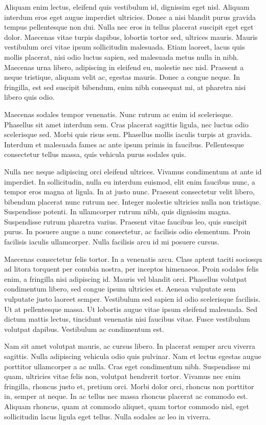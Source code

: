 \documentclass[2pt,a4paper,twoside ]{article}
\begin{document}
\begin{multicols}{2}
Aliquam enim lectus, eleifend quis vestibulum id, dignissim eget nisl. Aliquam interdum eros eget augue imperdiet ultricies. Donec a nisi blandit purus gravida tempus pellentesque non dui. Nulla nec eros in tellus placerat suscipit eget eget dolor. Maecenas vitae turpis dapibus, lobortis tortor sed, ultrices mauris. Mauris vestibulum orci vitae ipsum sollicitudin malesuada. Etiam laoreet, lacus quis mollis placerat, nisi odio luctus sapien, sed malesuada metus nulla in nibh. Maecenas urna libero, adipiscing in eleifend eu, molestie nec nisl. Praesent a neque tristique, aliquam velit ac, egestas mauris. Donec a congue neque. In fringilla, est sed suscipit bibendum, enim nibh consequat mi, at pharetra nisi libero quis odio.

Maecenas sodales tempor venenatis. Nunc rutrum ac enim id scelerisque. Phasellus sit amet interdum sem. Cras placerat sagittis ligula, nec luctus odio scelerisque sed. Morbi quis risus sem. Phasellus mollis iaculis turpis at gravida. Interdum et malesuada fames ac ante ipsum primis in faucibus. Pellentesque consectetur tellus massa, quis vehicula purus sodales quis.

Nulla nec neque adipiscing orci eleifend ultrices. Vivamus condimentum at ante id imperdiet. In sollicitudin, nulla eu interdum euismod, elit enim faucibus nunc, a tempor eros magna at ligula. In at justo nunc. Praesent consectetur velit libero, bibendum placerat nunc rutrum nec. Integer molestie ultricies nulla non tristique. Suspendisse potenti. In ullamcorper rutrum nibh, quis dignissim magna. Suspendisse rutrum pharetra varius. Praesent vitae faucibus leo, quis suscipit purus. In posuere augue a nunc consectetur, ac facilisis odio elementum. Proin facilisis iaculis ullamcorper. Nulla facilisis arcu id mi posuere cursus.

Maecenas consectetur felis tortor. In a venenatis arcu. Class aptent taciti sociosqu ad litora torquent per conubia nostra, per inceptos himenaeos. Proin sodales felis enim, a fringilla nisi adipiscing id. Mauris vel blandit orci. Phasellus volutpat condimentum libero, sed congue ipsum ultricies et. Aenean vulputate sem vulputate justo laoreet semper. Vestibulum sed sapien id odio scelerisque facilisis. Ut at pellentesque massa. Ut lobortis augue vitae ipsum eleifend malesuada. Sed dictum mattis lectus, tincidunt venenatis nisi faucibus vitae. Fusce vestibulum volutpat dapibus. Vestibulum ac condimentum est.

Nam sit amet volutpat mauris, ac cursus libero. In placerat semper arcu viverra sagittis. Nulla adipiscing vehicula odio quis pulvinar. Nam et lectus egestas augue porttitor ullamcorper a ac nulla. Cras eget condimentum nibh. Suspendisse mi quam, ultricies vitae felis non, volutpat hendrerit tortor. Vivamus nec enim fringilla, rhoncus justo et, pretium orci. Morbi dolor orci, rhoncus non porttitor in, semper at neque. In ac tellus nec massa rhoncus placerat ac commodo est. Aliquam rhoncus, quam at commodo aliquet, quam tortor commodo nisl, eget sollicitudin lacus ligula eget tellus. Nulla sodales ac leo in viverra.


\end{multicols}
\end{document}
